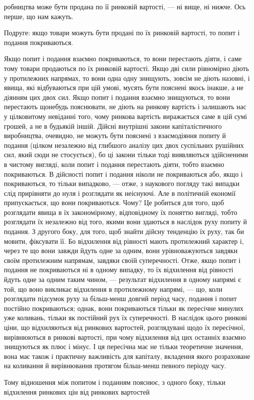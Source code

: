 робництва може бути продана по її ринковій вартості, — ні вище,
ні нижче. Ось перше, що нам кажуть.

Подруге: якщо товари можуть бути продані по їх ринковій
вартості, то попит і подання покриваються.

Якщо попит і подання взаємно покриваються, то вони перестають
діяти, і саме тому товари продаються по їх ринковій вартості.
Якщо дві сили рівномірно діють у протилежних напрямах,
то вони одна одну знищують, зовсім не діють назовні, і явища,
які відбуваються при цій умові, мусять бути пояснені якось
інакше, а не діянням цих двох сил. Якщо попит і подання взаємно
знищуються, то вони перестають щонебудь пояснювати,
не діють на ринкову вартість і залишають нас у цілковитому
невіданні того, чому ринкова вартість виражається саме в цій
сумі грошей, а не в будьякій іншій. Дійсні внутрішні закони
капіталістичного виробництва, очевидно, не можуть бути пояснені
з взаємодіяння попиту й подання (цілком незалежно від
глибшого аналізу цих двох суспільних рушійних сил, який сюди
не стосується), бо ці закони тільки тоді виявляються здійсненими
в чистому вигляді, коли попит і подання перестають
діяти, тобто взаємно покриваються. В дійсності попит і подання
ніколи не покриваються або, якщо і покриваються, то тільки
випадково, — отже, з наукового погляду такі випадки слід прирівняти
до нуля і розглядати як неіснуючі. Але в політичній
економії припускається, що вони покриваються. Чому? Це робиться
для того, щоб розглядати явища в їх закономірному, відповідному
їх поняттю вигляді, тобто розглядати їх незалежно від
того, якими вони здаються в наслідок руху попиту й подання.
З другого боку, для того, щоб знайти дійсну тенденцію їх руху, так
би мовити, фіксувати її. Бо відхилення від рівності мають протилежний
характер і, через те що вони завжди йдуть одне за одним,
вони урівноважуються завдяки своїм протилежним напрямам, завдяки
своїй суперечності. Отже, якщо попит і подання не покриваються
ні в одному випадку, то їх відхилення від рівності йдуть одне
за одним таким чином, — результат відхилення в одному напрямі
є той, що воно викликає відхилення в протилежному напрямі, —
що, коли розглядати підсумок руху за більш-менш довгий період
часу, подання і попит постійно покриваються; однак, вони покриваються
тільки як пересічне минулих уже коливань, тільки як
постійний рух їх суперечності. В наслідок цього ринкові ціни,
що відхиляються від ринкових вартостей, розглядувані щодо
їх пересічної, вирівнюються в ринкові вартості, при чому відхилення
від цих останніх взаємно знищуються як плюс і мінус.
І ця пересічна має не тільки теоретичне значення, вона має
також і практичну важливість для капіталу, вкладення якого розраховане
на коливання й вирівнювання протягом більш-менш певного
періоду часу.

Тому відношення між попитом і поданням пояснює, з одного
боку, тільки відхилення ринкових цін від ринкових вартостей
